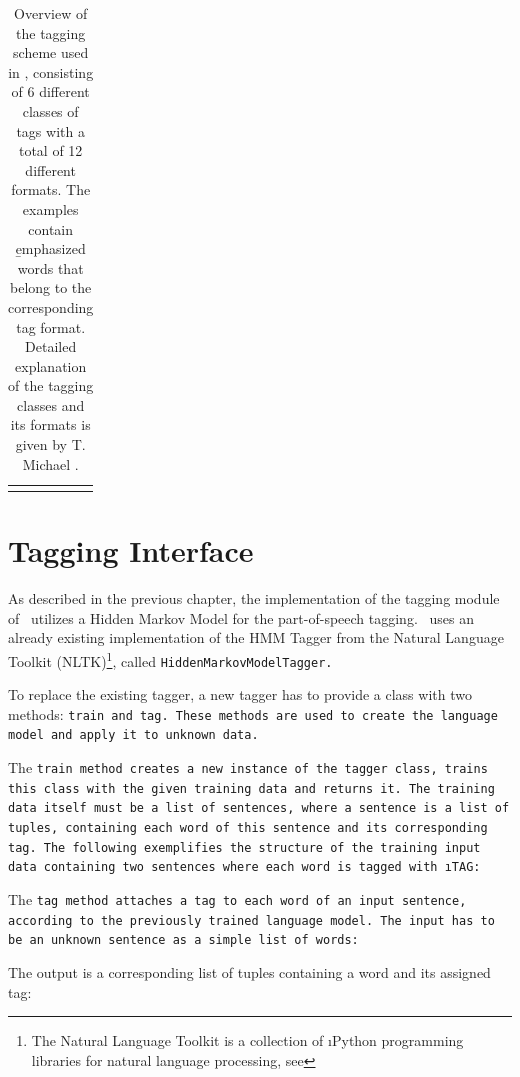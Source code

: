 \begin{table}[H]
\begin{tabular}{ p{2mm} L{48mm} p{35mm} p{40mm} }
	\brule
	\end{tabular}
	\caption[Tagging Scheme Overview]{Overview of the tagging scheme used in \Alex, consisting of 6 different classes of tags with a total of 12 different formats. The examples contain \b{emphasized} words that belong to the corresponding tag format. Detailed explanation of the tagging classes and its formats is given by T. Michael \cite{michael2016}.}
	\label{t.tagging_scheme}
	\vspace{1ex}
\end{table}

\section{Tagging Interface}\label{c.alex.tagging}
As described in the previous chapter, the implementation of the tagging module of \Alex\ utilizes a Hidden Markov Model for the part-of-speech tagging. \Alex\ uses an already existing implementation of the HMM Tagger from the Natural Language Toolkit (NLTK)\footnote{The Natural Language Toolkit is a collection of \i{Python} programming libraries for natural language processing, see }, called \tt{HiddenMarkovModelTagger}.

To replace the existing tagger, a new tagger has to provide a class with two methods: \tt{train} and \tt{tag}. These methods are used to create the language model and apply it to unknown data.

The \tt{train} method creates a new instance of the tagger class, trains this class with the given training data and returns it. The training data itself must be a list of sentences, where a sentence is a list of tuples, containing each word of this sentence and its corresponding tag. The following exemplifies the structure of the training input data containing two sentences where each word is tagged with \i{TAG}:



The \tt{tag} method attaches a tag to each word of an input sentence, according to the previously trained language model. The input has to be an unknown sentence as a simple list of words:



The output is a corresponding list of tuples containing a word and its assigned tag:




